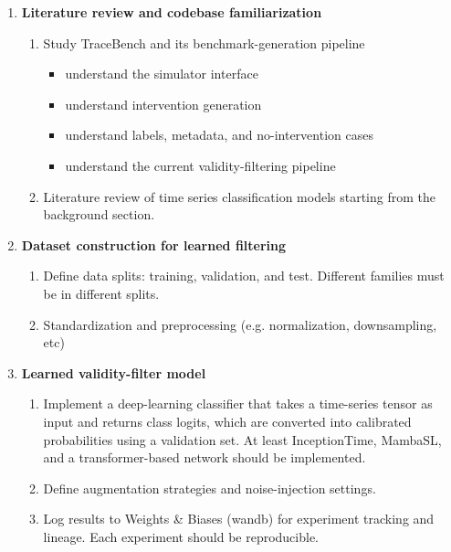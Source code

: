 \documentclass[11pt]{article}
\begin{document}
\begin{enumerate}[label=\arabic*.]
    \item \textbf{Literature review and codebase familiarization}
    \begin{enumerate}[label=\arabic{enumi}.\arabic*.]
        \item Study TraceBench and its benchmark-generation pipeline
        \begin{itemize}
            \item understand the simulator interface
            \item understand intervention generation
            \item understand labels, metadata, and no-intervention cases
            \item understand the current validity-filtering pipeline
        \end{itemize}
        \item Literature review of time series classification models starting from the background section.
    \end{enumerate}

    \item \textbf{Dataset construction for learned filtering}
    \begin{enumerate}[label=\arabic{enumi}.\arabic*.]
        \item Define data splits: training, validation, and test. 
        Different families must be in different splits.
        \item Standardization and preprocessing (e.g. normalization, downsampling, etc)
    \end{enumerate}

    \item \textbf{Learned validity-filter model}
    \begin{enumerate}[label=\arabic{enumi}.\arabic*.]
        \item Implement a deep-learning classifier that takes a time-series tensor as input and returns class logits, which are converted into calibrated probabilities using a validation set.
        At least InceptionTime, MambaSL, and a transformer-based network should be implemented.
        \item Define augmentation strategies and noise-injection settings.
        \item Log results to Weights \& Biases (wandb) for experiment tracking and lineage.
        Each experiment should be reproducible.
    \end{enumerate}


\end{enumerate}
\end{document}
